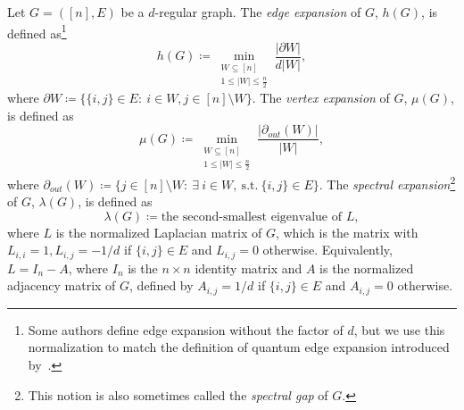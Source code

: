 \documentclass{toc}
\theoremstyle{plain}
\numberwithin{equation}{section}
\theoremstyle{definition}
\begin{document}
Let $G=([n],E)$ be a $d$-regular graph. The \emph{edge expansion} of $G$, $h(G)$, is defined as\footnote{Some authors define edge expansion without the factor of $d$, but we use this normalization to match the definition of quantum edge expansion introduced by~\cite{PhysRevA.76.032315}.}
\begin{equation}\label{eq: graph edge expansion}
h(G)\coloneqq \min_{\substack{W \subseteq [n]\\1\leq|W|\leq\frac{n}{2}}}\frac{|\partial W|}{d|W|},
\end{equation}
where $\partial W\coloneqq \{\{i,j\}\in E:~i\in W, j\in [n]\setminus W\}$. The \emph{vertex expansion} of $G$, $\mu(G)$, is defined as
\begin{equation}\label{eq: graph vertex expansion}
\mu(G)\coloneqq \min_{\substack{W \subseteq [n]\\1\leq|W|\leq\frac{n}{2}}}\frac{|\partial_{out}(W)|}{|W|},
\end{equation}
where $\partial_{out}(W)\coloneqq \{j\in [n]\setminus W:~\exists\ i\in W, ~\text{s.t.}~\{i,j\}\in E\}$.
The \emph{spectral expansion}\footnote{This notion is also sometimes called the \emph{spectral gap} of $G$.} of $G$, $\lambda(G)$, is defined as
\begin{equation}
    \lambda(G) \coloneqq \text{the second-smallest eigenvalue of }L\label{eq:graph spectral expansion},
\end{equation}
where $L$ is the normalized Laplacian matrix of $G$, which is the matrix with
$L_{i,i}=1, L_{i,j}=-1/d$ if $\{i,j\}\in E$ and $L_{i,j}=0$ otherwise. 
Equivalently, $L=I_n-A$, where $I_n$ is the $n\times n$ identity matrix and $A$ is the normalized adjacency matrix of $G$, defined by
$A_{i,j}=1/d$ if $\{i,j\}\in E$ and $A_{i,j}=0$ otherwise. 
\end{document}
